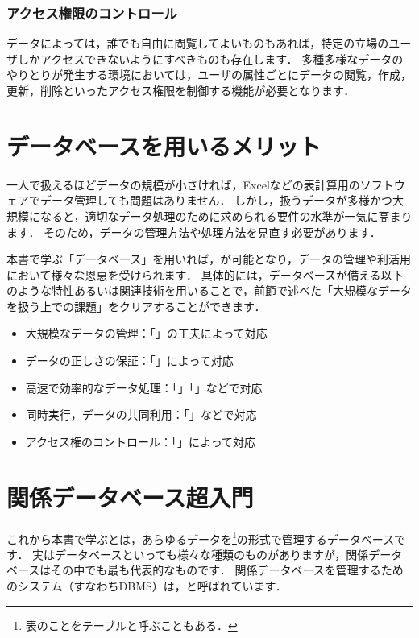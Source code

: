 \subsubsection{アクセス権限のコントロール}
データによっては，誰でも自由に閲覧してよいものもあれば，特定の立場のユーザしかアクセスできないようにすべきものも存在します．
多種多様なデータのやりとりが発生する環境においては，ユーザの属性ごとにデータの閲覧，作成，更新，削除といったアクセス権限を制御する機能が必要となります．


\section{データベースを用いるメリット}
一人で扱えるほどデータの規模が小さければ，Excelなどの表計算用のソフトウェアでデータ管理しても問題はありません．
しかし，扱うデータが多様かつ大規模になると，適切なデータ処理のために求められる要件の水準が一気に高まります．
そのため，データの管理方法や処理方法を見直す必要があります．

本書で学ぶ「データベース」を用いれば，が可能となり，データの管理や利活用において様々な恩恵を受けられます．
具体的には，データベースが備える以下のような特性あるいは関連技術を用いることで，前節で述べた「大規模なデータを扱う上での課題」をクリアすることができます．
\begin{itemize}
\item 大規模なデータの管理：「」の工夫によって対応
\item データの正しさの保証：「」によって対応
\item 高速で効率的なデータ処理：「」「」などで対応
\item 同時実行，データの共同利用：「」などで対応
\item アクセス権のコントロール：「」によって対応
\end{itemize}



\section{関係データベース超入門}
これから本書で学ぶとは，あらゆるデータを\footnote{表のことをテーブルと呼ぶこともある．}の形式で管理するデータベースです\cite{Codd1970}．
実はデータベースといっても様々な種類のものがありますが，関係データベースはその中でも最も代表的なものです．
関係データベースを管理するためのシステム（すなわちDBMS）は，と呼ばれています．

